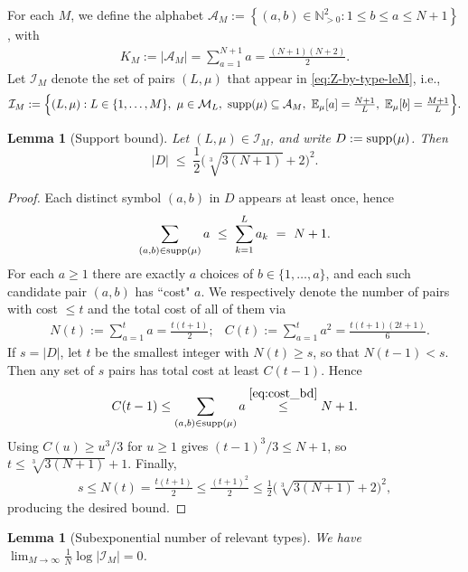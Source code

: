 \documentclass[11pt]{amsart}
\numberwithin{equation}{section}
\numberwithin{equation}{section}
\newcommand{\1}{\mathbbm{1}}
\newcommand{\E}{\mathbb{E}}
\newcommand{\supp}{\textup{supp}}
\newcommand{\N}{\mathbb{N}}
\newtheorem{lemma}[theorem]{Lemma}
\theoremstyle{definition}
\begin{document}
For each $M$, we define the alphabet $\mathcal A_M := \left\{ (a,b)\in\N_{>0}^2:1\le b\le a\le N+1 \right\}$, with
\begin{align*}
    K_M:=|\mathcal A_M|=\sum_{a=1}^{N+1} a=\frac{(N+1)(N+2)}{2}.
\end{align*}
Let $\mathcal I_M$ denote the set of pairs $(L,\mu)$ that appear in \eqref{eq:Z-by-type-leM}, i.e.,
\begin{align*}
    \mathcal I_M:=\Bigl\{(L,\mu):L\in\{1,\dots,M\},\
    \mu\in\mathcal M_L,\ \supp(\mu)\subseteq\mathcal A_M,\
    \E_\mu[a]=\tfrac{N+1}{L},\ \E_\mu[b]=\tfrac{M+1}{L}\Bigr\}.
\end{align*}
\begin{lemma}[Support bound]\label{lem:support-bound}
Let $(L,\mu)\in \mathcal I_M$, and write $D:=\supp(\mu)$. Then
\begin{equation}\label{eq:support-explicit}
    |D|
    \;\le\;
    \frac12\Big(\sqrt[3]{3(N+1)}+2\Big)^2.
\end{equation}
\end{lemma}
\begin{proof}
 Each distinct symbol $(a,b)$ in $D$ appears at least once, hence
\begin{align} \label{eq:cost_bd}
    \sum_{(a,b)\in\supp(\mu)} a \ \le\ \sum_{k=1}^L a_k \ =\ N+1.
\end{align}
For each $a\ge 1$ there are exactly $a$ choices of $b\in\{1,\dots,a\}$, and each such candidate pair $(a,b)$ has ``cost" $a$. We respectively denote the number of pairs with cost $\le t$ and the total cost of all of them via
\begin{align*}
    & N(t):=\sum_{a=1}^t a=\frac{t(t+1)}2;
    & C(t):=\sum_{a=1}^t a^2=\frac{t(t+1)(2t+1)}{6}.
\end{align*}
If $s=|D|$, let $t$ be the smallest integer with $N(t)\ge s$, so that $N(t-1) < s$. Then any set of $s$ pairs has total cost at least $C(t-1)$. Hence 
\begin{align*}
    C(t-1) \leq \sum_{(a,b)\in\supp(\mu)} a \stackrel{\eqref{eq:cost_bd}}{\leq} N+1.
\end{align*}
Using $C(u)\ge u^3/3$ for $u\ge 1$ gives $(t-1)^3/3\le N+1$, so $t\le \sqrt[3]{3(N+1)}+1$. Finally,
\begin{align*}
    s\le N(t)=\frac{t(t+1)}{2}\le \frac{(t+1)^2}{2}\le \frac12\Big(\sqrt[3]{3(N+1)}+2\Big)^2,
\end{align*}
producing the desired bound.
\end{proof}

\begin{lemma}[Subexponential number of relevant types]\label{lem:subexp-types}
We have $\lim_{M\to\infty}\frac{1}{N}\log|\mathcal I_M|=0$.
\end{lemma}
\end{document}
